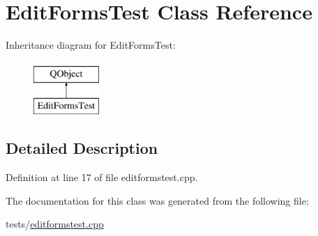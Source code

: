 \hypertarget{classEditFormsTest}{\section{Edit\+Forms\+Test Class Reference}
\label{classEditFormsTest}
}
Inheritance diagram for Edit\+Forms\+Test\+:\begin{figure}[H]
\begin{center}
\leavevmode
\includegraphics[height=2.000000cm]{classEditFormsTest}
\end{center}
\end{figure}


\subsection{Detailed Description}


Definition at line 17 of file editformstest.\+cpp.



The documentation for this class was generated from the following file\+:\begin{DoxyCompactItemize}
\item 
tests/\hyperlink{editformstest_8cpp}{editformstest.\+cpp}\end{DoxyCompactItemize}
